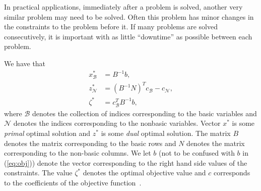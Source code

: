 In practical applications, immediately after a problem is solved, another very
similar problem may need to be solved.
Often this problem has minor changes in the constraints to the problem before
it.
If many problems are solved consecutively, it is important with as little
``downtime'' as possible between each problem.

We have that
\begin{align}
    x_{\mathcal{B}}^* &= B^{-1}b, \label{eq:vanderbei1} \\
    z_{\mathcal{N}}^* &= (B^{-1}N)^Tc_{\mathcal{B}}-c_{\mathcal{N}},
                                                      \label{eq:vanderbei2} \\
    \zeta^* &= c_{\mathcal{B}}^TB^{-1}b, \label{eq:vanderbei3}
\end{align}
where $\mathcal{B}$ denotes the collection of indices corresponding to the
basic variables and $\mathcal{N}$ denotes the indices corresponding to the
nonbasic variables.
Vector $x^*$ is some \emph{primal} optimal solution and $z^*$ is some
\emph{dual} optimal solution.
The matrix $B$ denotes the matrix corresponding to the basic rows and $N$
denotes the matrix corresponding to the non-basic columns.
We let $b$ (not to be confused with $b$ in (\ref{eq:obj})) denote the vector
corresponding to the right hand side values of the constraints.
The value $\zeta^*$ denotes the optimal objective value and $c$ corresponds to
the coefficients of the objective function~\cite{vanderbei}.

